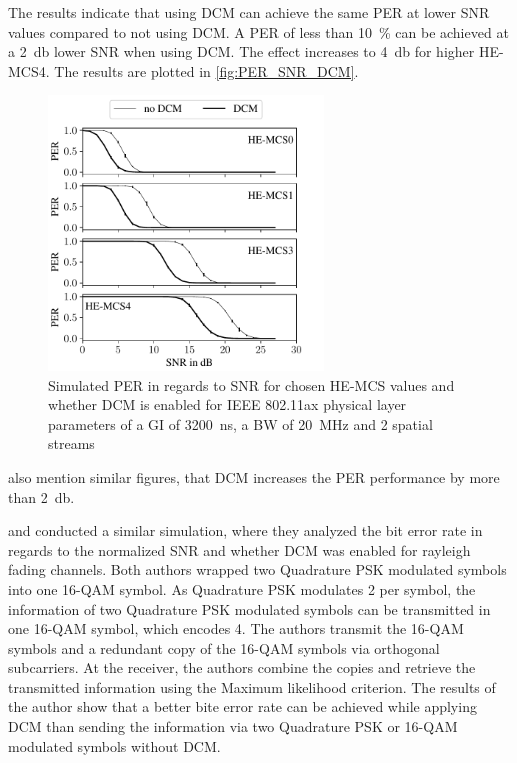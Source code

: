 The results indicate that using \ac{DCM} can achieve the same \ac{PER} at lower \ac{SNR} values compared to not using \ac{DCM}. A \ac{PER} of less than \SI{10}{\percent} can be achieved at
a \SI{2}{\decibel} lower \ac{SNR} when using \ac{DCM}.
The effect increases to \SI{4}{\decibel} for higher HE-\ac{MCS}\num{4}.
The results are plotted in \autoref{fig:PER_SNR_DCM}.
\begin{figure}[H]%
   \centering
   \includegraphics[width=0.65\textwidth]{figures/DCM_PER_to_SNR.pdf}
   \caption{Simulated \ac{PER} in regards to \ac{SNR} for chosen HE-\ac{MCS} values and whether \ac{DCM} is enabled for IEEE 802.11ax physical layer parameters of a \ac{GI} of \SI{3200}{\nano\second}, a \ac{BW} of \SI{20}{\mega\hertz} and 2 spatial streams}%
   \label{fig:PER_SNR_DCM}%
\end{figure}

\textcite{khorov_ieee_2015} also mention similar figures, that \ac{DCM} increases the \ac{PER} performance by more than \SI{2}{\decibel}.

\textcite{ryu_ber_2010} and \textcite{park_ber_2006} conducted a similar simulation, where they analyzed the bit error rate in
regards to the normalized \ac{SNR} and whether \ac{DCM} was enabled for rayleigh fading channels.
Both authors wrapped two Quadrature \ac{PSK} modulated symbols into one 16-\ac{QAM} symbol.
As Quadrature \ac{PSK} modulates \SI{2}{\bit} per symbol, the information of two Quadrature \ac{PSK} modulated symbols can be
transmitted in one 16-\ac{QAM} symbol, which encodes \SI{4}{\bit}.
The authors transmit the 16-\ac{QAM} symbols and a redundant copy
of the 16-\ac{QAM} symbols via orthogonal subcarriers.
At the receiver, the authors combine the copies and retrieve the transmitted
information using the Maximum likelihood criterion.
The results of the author show that a better bite error rate can be achieved while applying
\ac{DCM} than sending the information via two Quadrature \ac{PSK} or 16-\ac{QAM} modulated symbols without \ac{DCM}.



